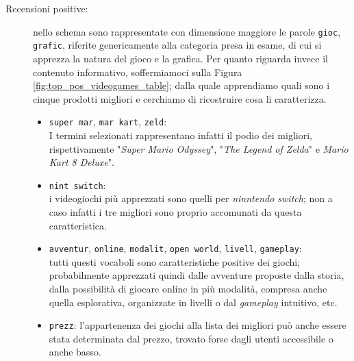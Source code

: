 				\begin{description}
					\item[Recensioni positive:]
					nello schema sono rappresentate con dimensione maggiore le parole \verb|gioc|, \verb|grafic|, riferite genericamente alla categoria presa in esame, di cui si apprezza la natura del gioco e la grafica. Per quanto riguarda invece il contenuto informativo, soffermiamoci sulla Figura \ref{fig:top_pos_videogames_table}; dalla quale apprendiamo quali sono i cinque prodotti migliori e cerchiamo di ricostruire cosa li caratterizza.
					\begin{itemize}
						\item \texttt{super mar}, \texttt{mar kart}, \texttt{zeld}: \\
						I termini selezionati rappresentano infatti il podio dei migliori, rispettivamente "\textit{Super Mario Odyssey}", "\textit{The Legend of Zelda}" e \textit{Mario Kart 8 Deluxe}". 
						\item \texttt{nint switch}: \\
						i videogiochi più apprezzati sono quelli per \textit{ninntendo switch}; non a caso infatti i tre migliori sono proprio accomunati da questa caratteristica.
						\item \texttt{avventur}, \texttt{online}, \texttt{modalit}, \texttt{open world}, \texttt{livell}, \texttt{gameplay}: \\
						tutti questi vocaboli sono caratteristiche positive dei giochi; probabilmente apprezzati quindi dalle avventure proposte dalla storia, dalla possibilità di giocare online in più modalità, compresa anche quella esplorativa, organizzate in livelli o dal \textit{gameplay} intuitivo, etc.
						\item \texttt{prezz}: l'appartenenza dei giochi alla lista dei migliori può anche essere stata determinata dal prezzo, trovato forse dagli utenti accessibile o anche basso.
					\end{itemize}	
									

\end{description}
